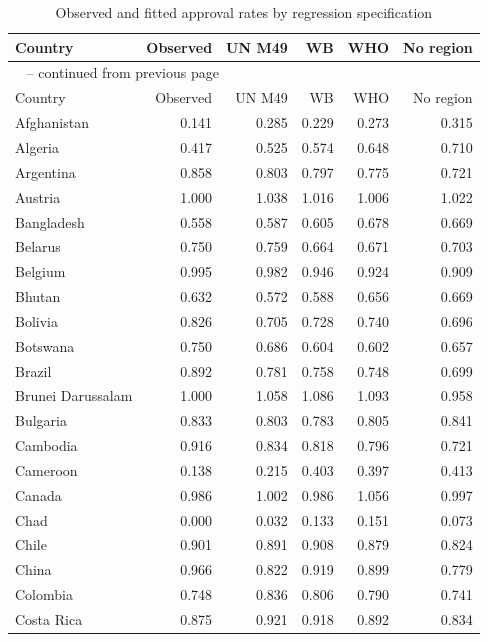 \documentclass[runningheads]{llncs}
\begin{document}
{\scriptsize
\renewcommand{\arraystretch}{1.12}
\setlength{\tabcolsep}{3pt}
\begin{longtable}{p{}rrrrr}
\caption{Observed and fitted approval rates by regression specification}\label{tab:appendix-prediction-comparison}\\
\hline
Country & Observed & UN M49 & WB & WHO & No region \\
\hline
\endfirsthead
\multicolumn{6}{l}{\tablename\ \thetable{} -- continued from previous page}\\
\hline
Country & Observed & UN M49 & WB & WHO & No region \\
\hline
\endhead
Afghanistan & 0.141 & 0.285 & 0.229 & 0.273 & 0.315 \\
Algeria & 0.417 & 0.525 & 0.574 & 0.648 & 0.710 \\
Argentina & 0.858 & 0.803 & 0.797 & 0.775 & 0.721 \\
Austria & 1.000 & 1.038 & 1.016 & 1.006 & 1.022 \\
Bangladesh & 0.558 & 0.587 & 0.605 & 0.678 & 0.669 \\
Belarus & 0.750 & 0.759 & 0.664 & 0.671 & 0.703 \\
Belgium & 0.995 & 0.982 & 0.946 & 0.924 & 0.909 \\
Bhutan & 0.632 & 0.572 & 0.588 & 0.656 & 0.669 \\
Bolivia & 0.826 & 0.705 & 0.728 & 0.740 & 0.696 \\
Botswana & 0.750 & 0.686 & 0.604 & 0.602 & 0.657 \\
Brazil & 0.892 & 0.781 & 0.758 & 0.748 & 0.699 \\
Brunei Darussalam & 1.000 & 1.058 & 1.086 & 1.093 & 0.958 \\
Bulgaria & 0.833 & 0.803 & 0.783 & 0.805 & 0.841 \\
Cambodia & 0.916 & 0.834 & 0.818 & 0.796 & 0.721 \\
Cameroon & 0.138 & 0.215 & 0.403 & 0.397 & 0.413 \\
Canada & 0.986 & 1.002 & 0.986 & 1.056 & 0.997 \\
Chad & 0.000 & 0.032 & 0.133 & 0.151 & 0.073 \\
Chile & 0.901 & 0.891 & 0.908 & 0.879 & 0.824 \\
China & 0.966 & 0.822 & 0.919 & 0.899 & 0.779 \\
Colombia & 0.748 & 0.836 & 0.806 & 0.790 & 0.741 \\
Costa Rica & 0.875 & 0.921 & 0.918 & 0.892 & 0.834 \\

\end{longtable}}
\end{document}
